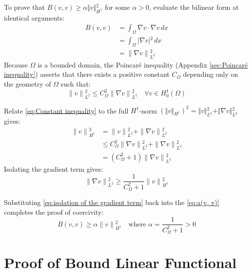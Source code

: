 \documentclass[acmsmall,screen]{MapleTrans}
\begin{document}
To prove that $B(v,v) \ge \alpha \Vert{}v\Vert{}_{H^1}^2$ for some $\alpha > 0$, evaluate the bilinear form at identical arguments:
\begin{equation}
\begin{aligned}
    B(v,v) &= \int_{\Omega }\nabla v\cdot \nabla v \,dx \\
    &= \int_{\Omega }|\nabla v|{}^{2}\,dx \\
    &= \|\nabla v\|{}_{L^{2}}^{2}
    \label{eq:a(v, v)}
\end{aligned}
\end{equation}
Because $\Omega$ is a bounded domain, the Poincaré inequality (Appendix \ref{sec:Poincaré inequality}) asserts that there exists a positive constant $C_{\Omega }$ depending only on the geometry of $\Omega$ such that:
\begin{equation}
    \|v\|{}_{L^{2}}^{2} \le C_{\Omega }^{2}\|\nabla v\|{}_{L^{2}}^{2}\quad \forall v\in H_{0}^{1}(\Omega )
    \label{eq:Constant inequality}
\end{equation}

Relate \eqref{eq:Constant inequality} to the full $H^{1}$-norm $(\Vert{}v\Vert{}_{H^1})^2 = \Vert{}v\Vert{}_{L^2}^2 + \Vert{}\nabla v\Vert{}_{L^2}^2$ gives:
\begin{equation}
\begin{aligned}
    \|v\|{}_{H^{1}}^{2} &= \|v\|{}_{L^{2}}^{2}+\|\nabla v\|{}_{L^{2}}^{2} \\
    &\le C_{\Omega }^{2}\|\nabla v\|{}_{L^{2}}^{2}+\|\nabla v\|{}_{L^{2}}^{2} \\
    &= (C_{\Omega }^{2}+1)\|\nabla v\|{}_{L^{2}}^{2}
\end{aligned}
\end{equation}
Isolating the gradient term gives:
\begin{equation}
    \|\nabla v\|{}_{L^{2}}^{2}\ge \frac{1}{C_{\Omega }^{2}+1}\|v\|{}_{H^{1}}^{2}
    \label{eq:isolation of the gradient term}
\end{equation}

Substituting \eqref{eq:isolation of the gradient term} back into the \eqref{eq:a(v, v)} completes the proof of coercivity:
\begin{equation}
    B(v,v)\ge \alpha \|v\|{}_{H^{1}}^{2}\quad \text{where\ }\alpha =\frac{1}{C_{\Omega }^{2}+1}>0
\end{equation}

\section{Proof of Bound Linear Functional} \label{sec:proof of bound}
\end{document}
